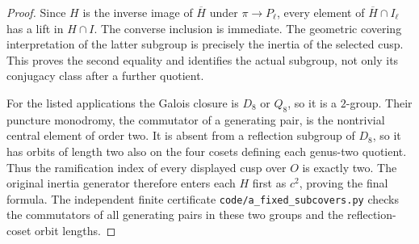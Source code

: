 \begin{proof}
Since $H$ is the inverse image of $\overline H$ under
$\pi\to P_\ell$, every element of $\overline H\cap I_\ell$
has a lift in $H\cap I$. The converse inclusion is immediate.
The geometric covering interpretation of the latter subgroup
is precisely the inertia of the selected cusp. This proves
the second equality and identifies the actual subgroup, not
only its conjugacy class after a further quotient.

For the listed applications the Galois closure is $D_8$ or
$Q_8$, so it is a $2$-group. Their puncture monodromy, the
commutator of a generating pair, is the nontrivial central
element of order two. It is absent from a reflection subgroup
of $D_8$, so it has orbits of length two also on the four
cosets defining each genus-two quotient. Thus the ramification
index of every displayed cusp over $O$ is exactly two.
The original inertia generator therefore enters each $H$
first as $c^2$, proving the final formula. The independent
finite certificate \texttt{code/a\_fixed\_subcovers.py}
checks the commutators of all generating pairs in these two
groups and the reflection-coset orbit lengths.
\end{proof}
